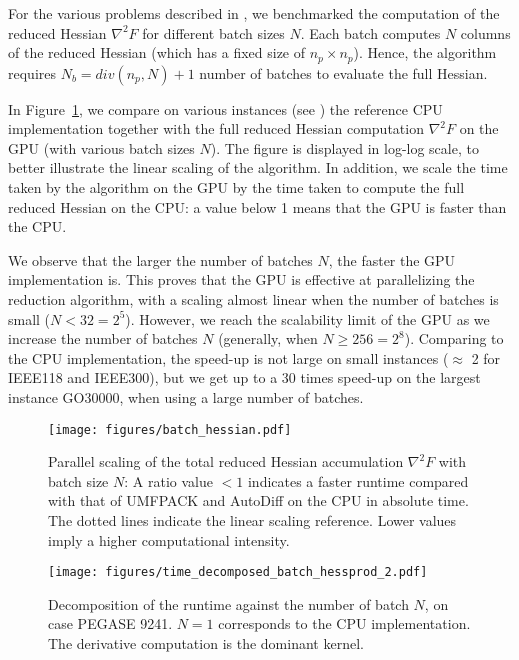 For the various problems described in , we
benchmarked the computation of the reduced Hessian $\nabla^2 F$ for different
batch sizes $N$. Each batch computes $N$ columns of the reduced Hessian (which
has a fixed size of $n_p \times n_p$).
Hence, the algorithm requires $N_b = div( n_p, N) +1$
number of batches to evaluate the full Hessian.

In Figure~\ref{fig:batch_scaling}, we compare on various instances (see
) the reference CPU implementation together
with the full reduced Hessian computation $\nabla^2 F$ on the GPU
(with various batch sizes $N$). The figure is displayed in log-log scale, to better illustrate the linear scaling of the algorithm.
In addition, we scale the time taken by
the algorithm on the GPU by the time taken
to compute the full reduced Hessian on the CPU: a value below 1 means that the GPU is faster than the CPU.

We observe that the larger the number of batches $N$, the faster the GPU implementation is. This proves that the GPU is effective at parallelizing the reduction algorithm, with a scaling almost linear
when the number of batches is small ($N < 32 = 2^5$).  However, we reach the scalability limit of the GPU as we increase the number of batches $N$ (generally, when $N \geq 256= 2^8$).
Comparing to the CPU implementation, the speed-up is not large on small instances ($\approx$ 2 for IEEE118 and
IEEE300), but we get up to a 30 times speed-up on the largest instance GO30000, when using a
large number of batches.

\begin{figure}[!ht]
    \centering
    \texttt{[image: figures/batch\_hessian.pdf]}
    \caption{
      Parallel scaling of the total reduced Hessian accumulation $\nabla^2 F$
      with batch size $N$: A ratio value $< 1$ indicates a faster runtime
      compared with that of UMFPACK and AutoDiff on the CPU in absolute time. The
      dotted lines indicate the linear scaling reference. Lower values imply a
      higher computational intensity.
    }
    \label{fig:batch_scaling}
\end{figure}

\begin{figure}[!ht]
    \centering
    \texttt{[image: figures/time\_decomposed\_batch\_hessprod\_2.pdf]}
    \caption{
      Decomposition of the runtime against the number of
      batch $N$, on case PEGASE 9241. $N=1$ corresponds to the CPU implementation.
      The derivative
      computation is the dominant kernel.}
    \label{fig:batch_time_decomposed}
\end{figure}

